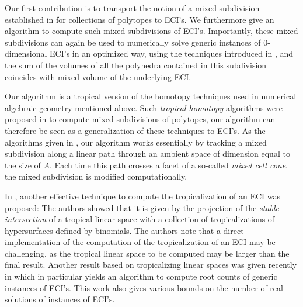 \documentclass[a4paper]{article}
\theoremstyle{remark}
\begin{document}
Our first contribution is to transport the notion of a mixed
subdivision established in \cite{huber1995} for collections of
polytopes to ECI's. We furthermore give an algorithm to compute such
mixed subdivisions of ECI's. Importantly, these mixed subdivisions can
again be used to numerically solve generic instances of
$0$-dimensional ECI's in an optimized way, using the techniques
introduced in \cite{helminckTropicalMethodSolving2024}, and the sum
of the volumes of all the polyhedra contained in this subdivision
coincides with mixed volume of the underlying ECI.

Our algorithm is a tropical version of the homotopy techniques used in
numerical algebraic geometry mentioned above. Such \textit{tropical
  homotopy} algorithms were proposed in
\cite{jensenTropicalHomotopyContinuation2016,
  malajovichComputingMixedVolume2017a} to compute mixed subdivisions
of polytopes, our algorithm can therefore be seen as a generalization
of these techniques to ECI's. As the algorithms given in
\cite{jensenTropicalHomotopyContinuation2016,
  malajovichComputingMixedVolume2017a}, our algorithm works
essentially by tracking a mixed subdivision along a linear path through
an ambient space of dimension equal to the size of $A$. Each time
this path crosses a facet of a so-called {\em mixed cell cone}, the
mixed subdivision is modified computationally.

In \cite{helminckTropicalMethodSolving2024}, another effective
technique to compute the tropicalization of an ECI was proposed: The
authors showed that it is given by the projection of the
\textit{stable intersection} of a tropical linear space with a
collection of tropicalizations of hypersurfaces defined by
binomials. The authors note that a direct implementation of the
computation of the tropicalization of an ECI may be challenging, as
the tropical linear space to be computed may be larger than the final
result. Another result based on tropicalizing linear spaces was
given recently in \cite{feliuRootBoundsVertical2026} which in
particular yields an algorithm to compute root counts of generic
instances of ECI's. This work also gives various bounds on the number
of real solutions of instances of ECI's.
\end{document}
